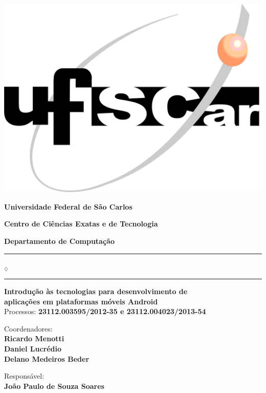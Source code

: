 
\begin{center}

\begin{minipage}[c]{\textwidth}
  \parbox[c]{3cm}{
      \begin{flushright}
      \includegraphics[width=.25\textwidth]{../figuras/LogoUfscar}
      \end{flushright}
  }
  \parbox[c]{12cm}
    {
      \begin{center}
      \textbf{\Large Universidade Federal de São Carlos}

      \vspace{0.07cm}

      \textbf{\large Centro de Ciências Exatas e de Tecnologia}

      \vspace{0.07cm}

      \textbf{\large Departamento de Computação}
      \vspace{0.07cm}
      \end{center}
    }
\end{minipage}

\vspace{-0.5cm}
\rule{7.5cm}{0.03pc}{\tiny $_\diamondsuit$}\rule{7.5cm}{0.03pc}

\vspace*{20ex}

\textbf{\Large {Introdução às tecnologias para desenvolvimento de \\ aplicações em plataformas móveis Android}} \\
\large{ Processos: \textbf{23112.003595/2012-35 e 23112.004023/2013-54}}

\vspace*{5ex}

{\Large{ Coordenadores:  }} \\
\textbf{\Large{ Ricardo Menotti}} \\
\textbf{\Large{ Daniel Lucrédio}} \\
\textbf{\Large{ Delano Medeiros Beder}}


\vspace*{5ex}

{\Large{ Responsável:  }}  \\
\textbf{\Large{ João Paulo de Souza Soares }}  \\


\end{center}
